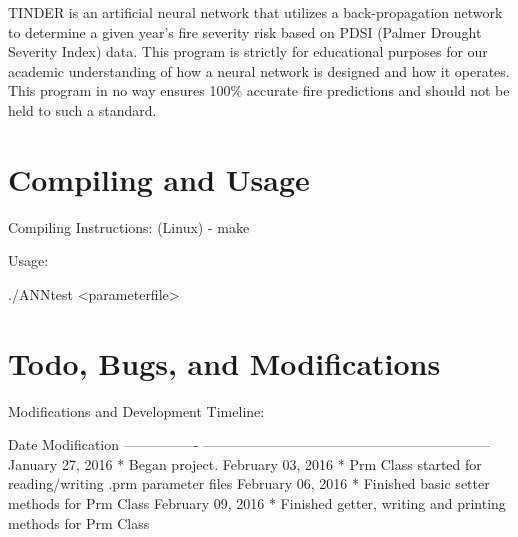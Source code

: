 T\-I\-N\-D\-E\-R is an artificial neural network that utilizes a back-\/propagation network to determine a given year's fire severity risk based on P\-D\-S\-I (Palmer Drought Severity Index) data. This program is strictly for educational purposes for our academic understanding of how a neural network is designed and how it operates. This program in no way ensures 100\% accurate fire predictions and should not be held to such a standard.\hypertarget{index_compile_section}{}\section{Compiling and Usage}\label{index_compile_section}
\begin{DoxyParagraph}{Compiling Instructions\-:}
(Linux) -\/ make
\end{DoxyParagraph}
\begin{DoxyParagraph}{Usage\-:}
\begin{DoxyVerb}./ANNtest <parameterfile>
\end{DoxyVerb}

\end{DoxyParagraph}
\hypertarget{index_todo_bugs_modification_section}{}\section{Todo, Bugs, and Modifications}\label{index_todo_bugs_modification_section}
\begin{DoxyParagraph}{Modifications and Development Timeline\-:}
\begin{DoxyVerb}Date              Modification
----------------  --------------------------------------------------------------
January  27, 2016  * Began project.
February 03, 2016  * Prm Class started for reading/writing .prm parameter files
February 06, 2016  * Finished basic setter methods for Prm Class
February 09, 2016  * Finished getter, writing and printing methods for Prm Class
\end{DoxyVerb}
 
\end{DoxyParagraph}

